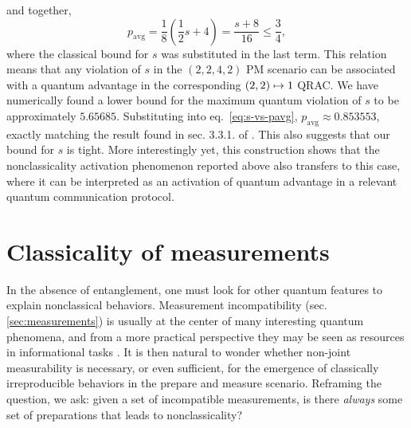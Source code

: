             and together,
            \begin{equation}
                p_{\text{avg}} = \frac{1}{8} \left( \frac{1}{2} s + 4 \right) = \frac{s + 8}{16} \leq \frac{3}{4} ,
                \label{eq:s-vs-pavg}
            \end{equation}
            where the classical bound for $s$ was substituted in the last term. This relation means that any violation of $s$ in the $(2,2,4,2)$ PM scenario can be associated with a quantum advantage in the corresponding $\left( 2, 2 \right) \mapsto 1$ QRAC. We have numerically found a lower bound for the maximum quantum violation of $s$ to be approximately $5.65685$. Substituting into eq.~\eqref{eq:s-vs-pavg}, $p_{\text{avg}} \approx 0.853553$, exactly matching the result found in sec. 3.3.1. of \cite{ambainis_srqracs_2009}. This also suggests that our bound for $s$ is tight. More interestingly yet, this construction shows that the nonclassicality activation phenomenon reported above also transfers to this case, where it can be interpreted as an activation of quantum advantage in a relevant quantum communication protocol. 


    \section{Classicality of measurements}
    \label{sec:measurement-classicality}

        In the absence of entanglement, one must look for other quantum features to explain nonclassical behaviors. Measurement incompatibility (sec. \ref{sec:measurements}) is usually at the center of many interesting quantum phenomena, and from a more practical perspective they may be seen as resources in informational tasks \cite{giovannetti_metrology_2006}. It is then natural to wonder whether non-joint measurability is necessary, or even sufficient, for the emergence of classically irreproducible behaviors in the prepare and measure scenario. Reframing the question, we ask: given a set of incompatible measurements, is there \emph{always} some set of preparations that leads to nonclassicality?

